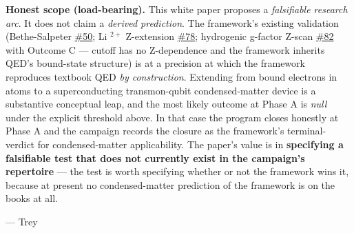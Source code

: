 \documentclass[
  11pt,
]{article}
\begin{document}
\textbf{Honest scope (load-bearing).} This white paper proposes a
\emph{falsifiable research arc}. It does not claim a \emph{derived
prediction}. The framework's existing validation (Bethe-Salpeter
\href{https://github.com/temoTxt/PyPhysics/issues/50}{\#50}; Li
\(^{2+}\) Z-extension
\href{https://github.com/temoTxt/PyPhysics/issues/78}{\#78}; hydrogenic
g-factor Z-scan
\href{https://github.com/temoTxt/PyPhysics/issues/82}{\#82} with Outcome
C --- cutoff has no Z-dependence and the framework inherits QED's
bound-state structure) is at a precision at which the framework
reproduces textbook QED \emph{by construction}. Extending from bound
electrons in atoms to a superconducting transmon-qubit condensed-matter
device is a substantive conceptual leap, and the most likely outcome at
Phase A is \emph{null} under the explicit threshold above. In that case
the program closes honestly at Phase A and the campaign records the
closure as the framework's terminal-verdict for condensed-matter
applicability. The paper's value is in \textbf{specifying a falsifiable
test that does not currently exist in the campaign's repertoire} --- the
test is worth specifying whether or not the framework wins it, because
at present no condensed-matter prediction of the framework is on the
books at all.

--- Trey
\end{document}
